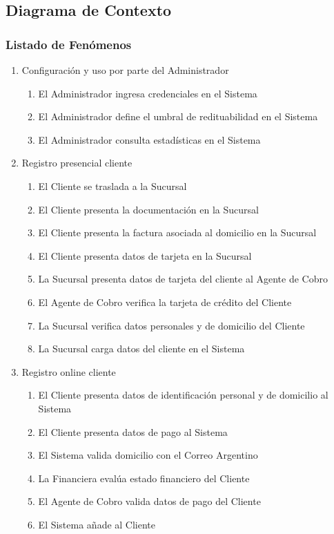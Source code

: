 \subsection{Diagrama de Contexto}

\subsubsection{Listado de Fenómenos}
\begin{enumerate}
 \item Configuración y uso por parte del Administrador
  \begin{enumerate}
   \item El Administrador ingresa credenciales en el Sistema
   \item El Administrador define el umbral de redituabilidad en el Sistema
   \item El Administrador consulta estadísticas en el Sistema
  \end{enumerate}

 \item Registro presencial cliente
  \begin{enumerate}
      \item El Cliente se traslada a la Sucursal
      \item El Cliente presenta la documentación en la Sucursal
      \item El Cliente presenta la factura asociada al domicilio en la Sucursal
      \item El Cliente presenta datos de tarjeta en la Sucursal
      \item La Sucursal presenta datos de tarjeta del cliente al Agente de Cobro
      \item El Agente de Cobro verifica la tarjeta de crédito del Cliente
      \item La Sucursal verifica datos personales y de domicilio del Cliente
      \item La Sucursal carga datos del cliente en el Sistema
  \end{enumerate}
  
 \item Registro online cliente
  \begin{enumerate}
    \item El Cliente presenta datos de identificación personal y de domicilio al Sistema
    \item El Cliente presenta datos de pago al Sistema
    \item El Sistema valida domicilio con el Correo Argentino
    \item La Financiera evalúa estado financiero del Cliente
    \item El Agente de Cobro valida datos de pago del Cliente
    \item El Sistema añade al Cliente
  \end{enumerate}
  

\end{enumerate}
